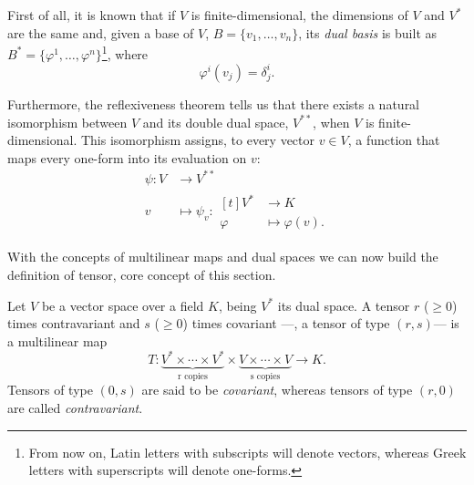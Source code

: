 First of all, it is known that if $V$ is finite-dimensional, the dimensions of $V$ and $V^*$ are the same and, given a base of $V$, $B = \{v_1, \dots, v_n\}$, its \emph{dual basis} is built as $B^* = \{\varphi^1, \dots, \varphi^n\}$\footnote{From now on, Latin letters with subscripts will denote vectors, whereas Greek letters with superscripts will denote one-forms.}, where
\[
	\varphi^i(v_j) = \delta^i_j.
\]

Furthermore, the reflexiveness theorem  tells us that there exists a natural isomorphism between $V$ and its double dual space, $V^{**}$, when $V$ is finite-dimensional. This isomorphism assigns, to every vector $v \in V$, a function that maps every one-form into its evaluation on $v$:
\begin{align*}
	\psi \colon V &\longrightarrow V^{**} \\
	v &\longmapsto \psi_v \colon \begin{aligned}[t]
		V^* &\longrightarrow K \\
		\varphi &\longmapsto \varphi(v).
	\end{aligned}
\end{align*}

With the concepts of multilinear maps and dual spaces we can now build the definition of tensor, core concept of this section.

\begin{definition}[Tensor]
	\label{def:tensor}
	Let $V$ be a vector space over a field $K$, being $V^*$ its dual space. A tensor $r$ ($\geq 0$) times contravariant and $s$ ($\geq 0$) times covariant ---\ie, a tensor of type $(r,s)$--- is a multilinear map
	\[
		T \colon \underbrace{V^* \times \cdots \times V^*}_{\text{r copies}} \times \underbrace{V \times \cdots \times V}_{\text{s copies}} \longrightarrow K.
	\]
	Tensors of type $(0,s)$ are said to be \emph{covariant}, whereas tensors of type $(r,0)$ are called \emph{contravariant}.
\end{definition}

